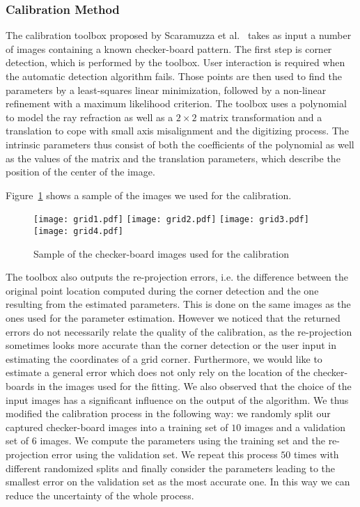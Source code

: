 \subsubsection{Calibration Method} 
\label{sec:calibration_method}
The calibration toolbox proposed by Scaramuzza et al.~\cite{scaramuzza2006toolbox} takes as input a number of images containing a known checker-board pattern. The first step is corner detection, which is performed by the toolbox. User interaction is required when the automatic detection algorithm fails. Those points are then used to find the parameters by a least-squares linear minimization, followed by a non-linear refinement with a maximum likelihood criterion. The toolbox uses a polynomial to model the ray refraction as well as a $2 \times 2$ matrix transformation and a translation to cope with small axis misalignment and the digitizing process. The intrinsic parameters thus consist of both the coefficients of the polynomial as well as the values of the matrix and the translation parameters, which describe the position of the center of the image.

Figure~\ref{fig:calibration_images} shows a sample of the images we used for the calibration.

\begin{figure}[htbp]
\begin{center}
\texttt{[image: grid1.pdf]}
\texttt{[image: grid2.pdf]}
\texttt{[image: grid3.pdf]}
\texttt{[image: grid4.pdf]}
\caption{Sample of the checker-board images used for the calibration\label{fig:calibration_images}}
\end{center}
\end{figure}

The toolbox also outputs the re-projection errors, i.e. the difference between the original point location computed during the corner detection and the one resulting from the estimated parameters. This is done on the same images as the ones used for the parameter estimation. However we noticed that the returned errors do not necessarily relate the quality of the calibration, as the re-projection sometimes looks more accurate than the corner detection or the user input in estimating the coordinates of a grid corner. Furthermore, we would like to estimate a general error which does not only rely on the location of the checker-boards in the images used for the fitting. We also observed that the choice of the input images has a significant influence on the output of the algorithm. We thus modified the calibration process in the following way: we randomly split our captured checker-board images into a training set of $10$ images and a validation set of $6$ images. We compute the parameters using the training set and the re-projection error using the validation set. We repeat this process $50$ times with different randomized splits and finally consider the parameters leading to the smallest error on the validation set as the most accurate one. In this way we can reduce the uncertainty of the whole process. 

